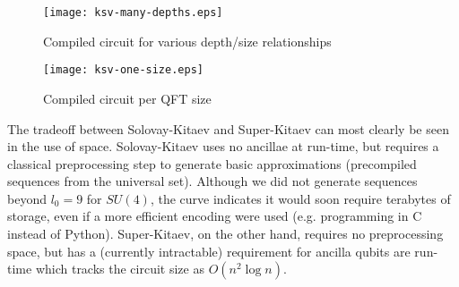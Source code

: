 


\begin{center}
\begin{figure}[h!]
\label{fig:many-depth}
\texttt{[image: ksv-many-depths.eps]}
\caption{Compiled circuit for various depth/size relationships}
\end{figure}
\end{center}

\begin{center}
\begin{figure}[h!]
\label{fig:one-size}
\texttt{[image: ksv-one-size.eps]}
\caption{Compiled circuit per QFT size}
\end{figure}
\end{center}

The tradeoff between Solovay-Kitaev and Super-Kitaev can most clearly
be seen in the use of space. Solovay-Kitaev uses no ancillae at run-time,
but requires a classical preprocessing step to generate basic
approximations (precompiled sequences from the universal set). Although
we did not generate sequences beyond $l_0 = 9$ for $SU(4)$, the curve
indicates it would soon require terabytes of storage, even if a more
efficient encoding were used (e.g. programming in C instead of Python).
Super-Kitaev, on the other hand, requires no preprocessing space, but
has a (currently intractable) requirement for ancilla qubits are run-time
which tracks the circuit size as $O(n^2 \log n)$.

